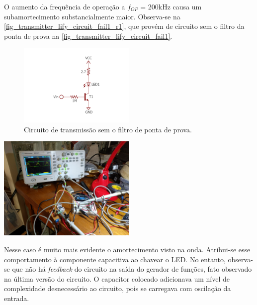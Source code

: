 	O aumento da frequência de operação a $f_{OP}$ = 200kHz causa um subamortecimento substancialmente maior. Observa-se na \autoref{fig_transmitter_lify_circuit_fail1_r1}, que provém de circuito sem o filtro da ponta de prova na \autoref{fig_transmitter_lify_circuit_fail1}.
	\begin{figure}[h!]
		\caption{\label{fig_transmitter_lify_circuit_fail1}Circuito de transmissão sem o filtro de ponta de prova.}
		\centering
		\includegraphics[width=0.5\textwidth, trim={2cm 2cm 2cm 2.3cm}, clip]{circuits/transmitter_fail1.pdf}
	\end{figure}
	\begin{chart}[h!]
		\caption{\label{fig_transmitter_lify_circuit_fail1_r1}Operação de circuito transmissor sem ponta de prova. A onda amarela representa voltagem no LED sem filtro de ponta de prova em frequências mais altas. O gerador de funções é medido e gera a forma de onda verde.}
		\centering
		\includegraphics[width=0.5\textwidth, trim={22.5cm 69cm 87cm 16cm}, clip]{circuits/photos/TX_200k_without_filter.jpg}
	\end{chart}
	Nesse caso é muito mais evidente o amortecimento visto na onda. Atribui-se esse comportamento à componente capacitiva ao chavear o LED. No entanto, observa-se que não há \textit{feedback} do circuito na saída do gerador de funções, fato observado na última versão do circuito. O capacitor colocado adicionava um nível de complexidade desnecessário ao circuito, pois se carregava com oscilação da entrada. 
	

